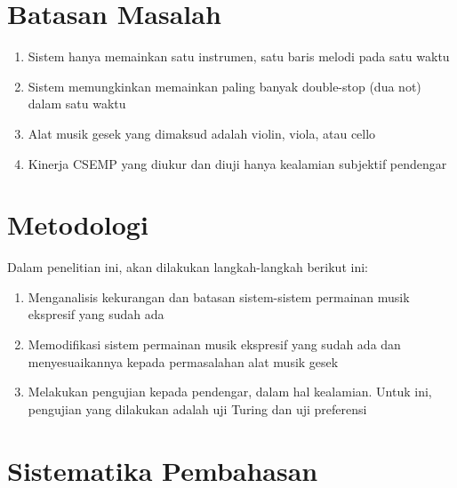 \section{Batasan Masalah}

\begin{enumerate}
	\item Sistem hanya memainkan satu instrumen, satu baris melodi pada satu waktu
	\item Sistem memungkinkan memainkan paling banyak double-stop (dua not) dalam satu waktu
	\item Alat musik gesek yang dimaksud adalah violin, viola, atau cello
	\item Kinerja CSEMP yang diukur dan diuji hanya kealamian subjektif pendengar
\end{enumerate}

\section{Metodologi}

Dalam penelitian ini, akan dilakukan langkah-langkah berikut ini:
\begin{enumerate}
	\item Menganalisis kekurangan dan batasan sistem-sistem permainan musik ekspresif yang sudah ada
	\item Memodifikasi sistem permainan musik ekspresif yang sudah ada dan menyesuaikannya kepada permasalahan alat musik gesek
	\item Melakukan pengujian kepada pendengar, dalam hal kealamian. Untuk ini, pengujian yang dilakukan adalah uji Turing dan uji preferensi
\end{enumerate}

\section{Sistematika Pembahasan}

